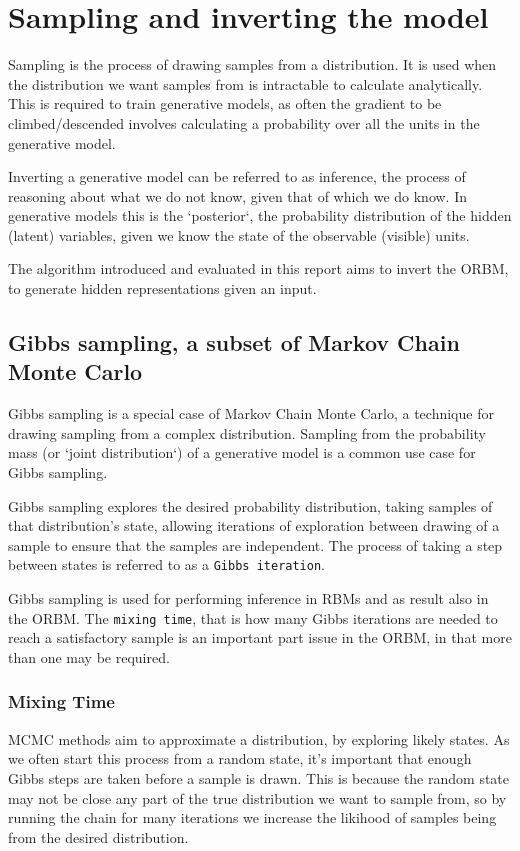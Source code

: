 \section{Sampling and inverting the model}

Sampling is the process of drawing samples from a distribution. It is used when the distribution we want samples from is intractable to calculate analytically. This is required to train generative models, as often the gradient to be climbed/descended involves calculating a probability over all the units in the generative model.

Inverting a generative model can be referred to as inference, the process of reasoning about what we do not know, given that of which we do know. In generative models this is the `posterior`, the probability distribution of the hidden (latent) variables, given we know the state of the observable (visible) units.

The algorithm introduced and evaluated in this report aims to invert the ORBM, to generate hidden representations given an input.

\subsection{Gibbs sampling, a subset of Markov Chain Monte Carlo}

Gibbs sampling is a special case of Markov Chain Monte Carlo, a technique for drawing sampling from a complex distribution. Sampling from the probability mass (or `joint distribution`) of a generative model is a common use case for Gibbs sampling.

Gibbs sampling explores the desired probability distribution, taking samples of that distribution's state, allowing iterations of exploration between drawing of a sample to ensure that the samples are independent. The process of taking a step between states is referred to as a \texttt{Gibbs iteration}.

Gibbs sampling is used for performing inference in RBMs and as result also in the ORBM. The \texttt{mixing time}, that is how many Gibbs iterations are needed to reach a satisfactory sample is an important part issue in the ORBM, in that more than one may be required.

\subsubsection{Mixing Time}

MCMC methods aim to approximate a distribution, by exploring likely states. As we often start this process from a random state, it's important that enough Gibbs steps are taken before a sample is drawn. This is because the random state may not be close any part of the true distribution we want to sample from, so by running the chain for many iterations we increase the likihood of samples being from the desired distribution.

